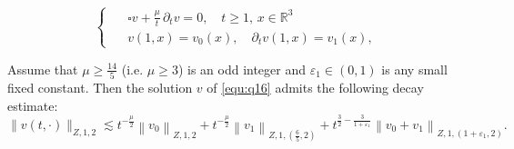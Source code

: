 \documentclass[10pt,a4paper]{amsart}
\newcommand{\R}{\mathbb R}
\newcommand{\f}{\frac}
\newcommand{\p}{\partial}
\begin{document}
\begin{equation}\label{equ:q16}
\left\{ \enspace
\begin{aligned}
&\square v +\f{\mu}{t}\,\p_tv=0, \quad
t\geq 1, \,x\in\R^3\\
&v(1,x)=v_0(x), \quad \partial_{t} v(1,x)=v_1(x),
\end{aligned}
\right.
\end{equation}

\begin{lemma}\label{lem2}
Assume that $\mu\geq \f{14}{5}$ (i.e. $\mu\ge3$) is an odd integer and  $\varepsilon_1\in(0, 1)$ is any small fixed constant.
Then the solution
$v$ of \eqref{equ:q16} admits the following decay estimate:
\begin{equation}\label{equ:q17}
\|v(t, \cdot)\|_{Z, 1, 2} \lesssim t^{-\f{\mu}{2}}\left\|v_0\right\|_{Z, 1, 2}
+t^{-\f{\mu}{2}}\left\|v_1\right\|_{Z, 1,(\f{6}{5}, 2)}
+t^{\f{3}{2}-\f{3}{1+\varepsilon_1}}\left\|v_0+v_1\right\|_{Z, 1,(1+\varepsilon_1, 2)}.
\end{equation}
\end{lemma}
\end{document}
